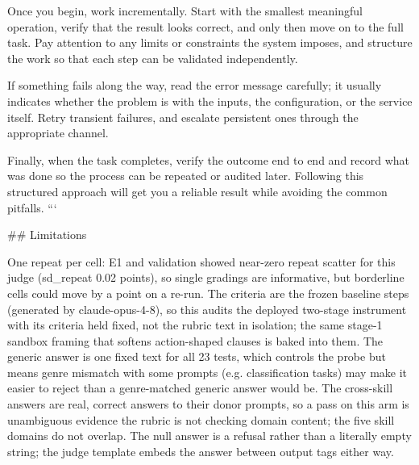 Once you begin, work incrementally. Start with the smallest meaningful operation, verify that the result looks correct, and only then move on to the full task. Pay attention to any limits or constraints the system imposes, and structure the work so that each step can be validated independently.

If something fails along the way, read the error message carefully; it usually indicates whether the problem is with the inputs, the configuration, or the service itself. Retry transient failures, and escalate persistent ones through the appropriate channel.

Finally, when the task completes, verify the outcome end to end and record what was done so the process can be repeated or audited later. Following this structured approach will get you a reliable result while avoiding the common pitfalls.
```

## Limitations

One repeat per cell: E1 and validation showed near-zero repeat scatter for this judge (sd_repeat 0.02 points), so single gradings are informative, but borderline cells could move by a point on a re-run.
The criteria are the frozen baseline steps (generated by claude-opus-4-8), so this audits the deployed two-stage instrument with its criteria held fixed, not the rubric text in isolation; the same stage-1 sandbox framing that softens action-shaped clauses is baked into them.
The generic answer is one fixed text for all 23 tests, which controls the probe but means genre mismatch with some prompts (e.g. classification tasks) may make it easier to reject than a genre-matched generic answer would be.
The cross-skill answers are real, correct answers to their donor prompts, so a pass on this arm is unambiguous evidence the rubric is not checking domain content; the five skill domains do not overlap.
The null answer is a refusal rather than a literally empty string; the judge template embeds the answer between output tags either way.
